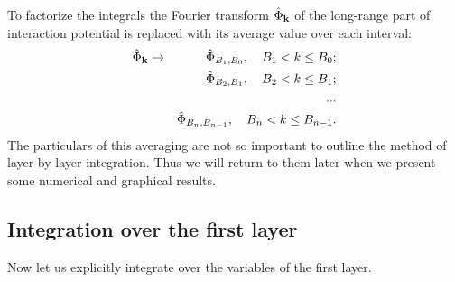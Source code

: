 To factorize the integrals the Fourier transform $\hat{\Phi}_{\vb k}$ of the long-range part of interaction potential is replaced with its average value over each interval:
\begin{eqnarray*}
	\hat{\Phi}_{\vb k} & \rightarrow & \hat{\Phi}_{B_1, B_0}, \quad B_1 < k \leq B_0;
	\\
	& & \hat{\Phi}_{B_2, B_1}, \quad B_2 < k \leq B_1;
	\\
	& & ...
	\\
	& & \hat{\Phi}_{B_n, B_{n-1}}, \quad B_n < k \leq B_{n-1}.
\end{eqnarray*}
The particulars of this averaging are not so important to outline the method of layer-by-layer integration. Thus we will return to them later when we present some numerical and graphical results.

\subsection{Integration over the first layer}
Now let us explicitly integrate over the variables of the first layer.

